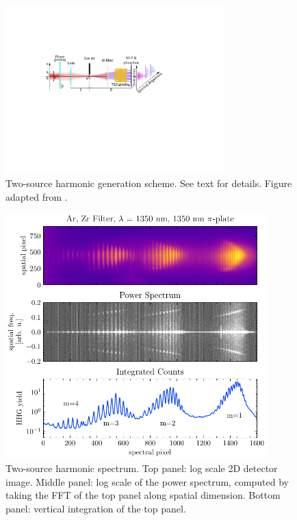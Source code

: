 \begin{figure}
	\centering
	\includegraphics[width=0.75\textwidth]{figures/chap2/two_source_cartoon.pdf}
	\caption{Two-source harmonic generation scheme. See text for details. Figure adapted from \cite{camperHighRelativephasePrecision2019}.}
	\label{fig:two-source-cartoon}
\end{figure}

\begin{figure}
	\centering
	\includegraphics[width=0.9\textwidth]{figures/chap2/multi-order-PiPlate.pdf}
	\caption{Two-source harmonic spectrum. Top panel: log scale 2D detector image. Middle panel: log scale of the power spectrum, computed by taking the FFT of the top panel along spatial dimension. Bottom panel: vertical integration of the top panel.}
	\label{fig:multi-order-PiPlate}
\end{figure}

